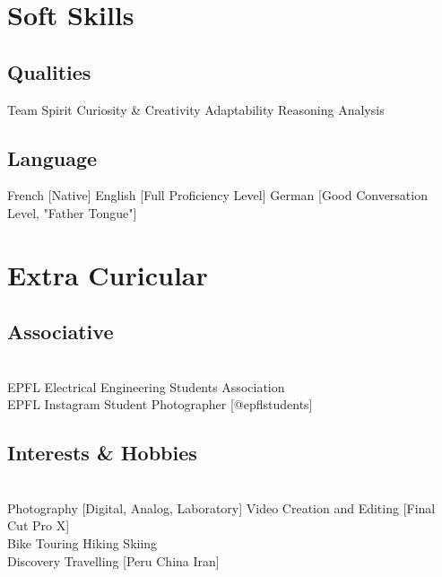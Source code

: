 \documentclass{article}
\newcommand{\descript}[1]{\color{darkgray}\normalfont \textbf{#1\\}}
\newcommand{\longdescript}[1]{\color{subheadings}\normalfont\small {#1\\}}
\newcommand{\sectionsep}[0]{\vspace{-6pt}}
\newcommand{\mybullet}[1]{ \hspace{2pt}\textbullet{#1}\hspace{2pt} }
\begin{document}
\section{Soft Skills}
\subsection{Qualities}
\longdescript{Team Spirit \mybullet{} Curiosity \& Creativity\mybullet{} Adaptability\mybullet{}  Reasoning \mybullet{} Analysis     }
\sectionsep
\subsection{Language}
\longdescript{French [Native] \mybullet{} English [Full Proficiency Level] \mybullet{} German [Good Conversation Level, "Father Tongue"]}
\sectionsep

\section{Extra Curicular}
\subsection{Associative}
\descript{}
\longdescript{EPFL Electrical Engineering Students Association \\ EPFL Instagram Student Photographer [@epflstudents] }
\sectionsep
\subsection{Interests \& Hobbies}
\descript{}
\longdescript{Photography [Digital, Analog, Laboratory] \mybullet{}  Video Creation and Editing [Final Cut Pro X]  \\ 
Bike Touring \mybullet{} Hiking \mybullet{} Skiing \\
Discovery Travelling [Peru China Iran]
} 
\sectionsep
\end{document}
